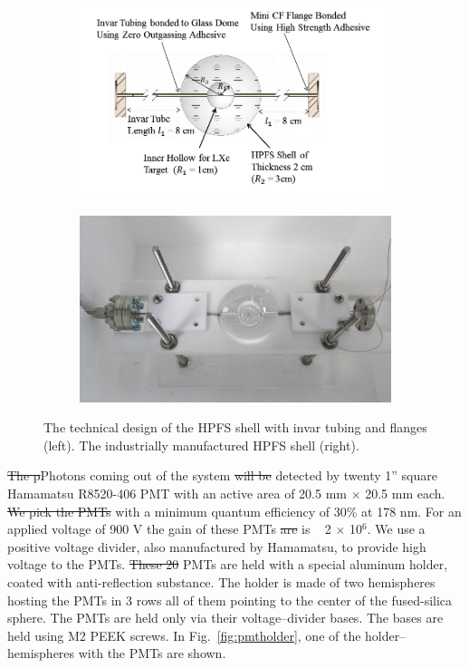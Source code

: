 \begin{figure}
\centering
\begin{subfigure}[c]{0.4\textheight}
\includegraphics[width=\textwidth]{spheredesign1.png}
\end{subfigure}
\begin{subfigure}[c]{0.25\textheight}
\includegraphics[width=\textwidth]{spherephoto.png}
\end{subfigure}
\caption{The technical design of the HPFS shell with invar tubing and flanges (left). The industrially manufactured
HPFS shell (right).} 
\label{fig:sphere}
\end{figure}


\sout{The p}Photons coming out of the system \sout{will be } detected by twenty 1'' square Hamamatsu R8520-406 PMT with an active area of 20.5 mm $\times$ 20.5 mm each. \sout{We pick the PMTs}   with a minimum quantum efficiency of 30\% at 178 nm. For an applied voltage of 900 V the gain of these PMTs \sout{are} is ~ 2 $\times$ 10$^6$. We use a positive voltage divider, also manufactured by Hamamatsu, to provide high voltage to the PMTs.  \sout{These 20} PMTs are held with a special aluminum holder, coated with anti-reflection substance. The holder is made of two hemispheres hosting the PMTs in 3 rows all of them pointing to the center of the  fused-silica sphere. The PMTs are held only via their voltage--divider bases. The bases are held using M2 PEEK screws. 
In Fig.~\ref{fig:pmtholder}, one of the holder--hemispheres with the PMTs  are shown.


